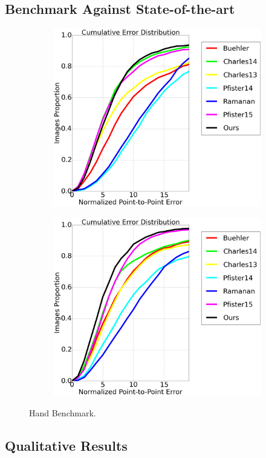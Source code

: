 \subsection{Benchmark Against State-of-the-art}
\label{exp:benchmark}

\begin{figure}[t!]
    \centering
    \begin{subfigure}[b]{0.23\textwidth}
            \includegraphics[width=\textwidth]{resources/HandBenchmark/elbow}
    \end{subfigure}
    \hfill
    \begin{subfigure}[b]{0.23\textwidth}
            \includegraphics[width=\textwidth]{resources/HandBenchmark/wrist}
    \end{subfigure}
    \caption{Hand Benchmark.}
    \label{fig:hand_benchmark}
\end{figure}


\subsection{Qualitative Results}
\label{exp:qualitative}
